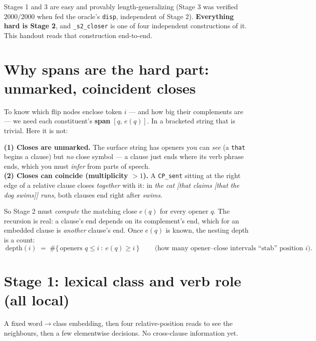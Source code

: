 \documentclass[11pt]{article}
\newcommand{\code}[1]{\texttt{#1}}
\begin{document}
\noindent Stages 1 and 3 are easy and provably length-generalizing (Stage 3 was verified $2000/2000$
when fed the oracle's \code{disp}, independent of Stage 2). \textbf{Everything hard is Stage 2},
and \texttt{\_s2\_closer} is one of four independent constructions of it. This handout reads that
construction end-to-end.

\section{Why spans are the hard part: unmarked, coincident closes}

To know which flip nodes enclose token $i$ --- and how big their complements are --- we need each
constituent's \textbf{span} $[q,\,e(q)]$. In a bracketed string that is trivial. Here it is not:

\begin{keybox}
\textbf{(1) Closes are unmarked.} The surface string has openers you can \emph{see} (a \code{that}
begins a clause) but \emph{no} close symbol --- a clause just ends where its verb phrase ends, which
you must \emph{infer} from parts of speech.\\[3pt]
\textbf{(2) Closes can coincide (multiplicity $>1$).} A \code{CP\_sent} sitting at the right edge of
a relative clause closes \emph{together} with it: in \emph{the cat [that claims [that the dog
swims]] runs}, both clauses end right after \emph{swims}.
\end{keybox}

\noindent So Stage 2 must \emph{compute} the matching close $e(q)$ for every opener $q$. The
recursion is real: a clause's end depends on its complement's end, which for an embedded clause is
\emph{another} clause's end. Once $e(q)$ is known, the nesting depth is a count:
\[
  \boxed{\ \text{depth}(i) \;=\; \#\{\,\text{openers } q \le i \ :\ e(q) \ge i\,\}\ }
  \qquad\text{(how many opener--close intervals ``stab'' position $i$).}
\]

\section{Stage 1: lexical class and verb role (all local)}

A fixed word$\to$class embedding, then four relative-position reads to see the neighbours, then a
few elementwise decisions. No cross-clause information yet.
\end{document}
